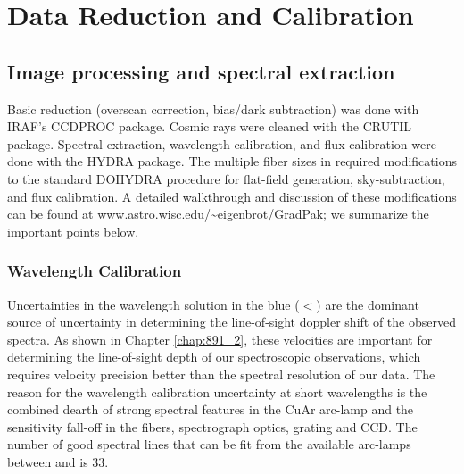 \section{Data Reduction and Calibration}
\label{891_1:sec:data_reduction}

\subsection{Image processing and spectral extraction}

Basic reduction (overscan correction, bias/dark subtraction) was done
with IRAF's CCDPROC package. Cosmic rays were cleaned with the CRUTIL
package. Spectral extraction, wavelength calibration, and flux
calibration were done with the HYDRA package. The multiple fiber sizes
in \GP required modifications to the standard DOHYDRA procedure for
flat-field generation, sky-subtraction, and flux calibration. A
detailed walkthrough and discussion of these modifications can be
found at \url{www.astro.wisc.edu/~eigenbrot/GradPak}; we summarize the
important points below.

\subsubsection{Wavelength Calibration}
\label{891_1:sec:wavecal}

Uncertainties in the wavelength solution in the blue
($<$) are the dominant source of uncertainty in
determining the line-of-sight doppler shift of the observed
spectra. As shown in Chapter \ref{chap:891_2}, these velocities are
important for determining the line-of-sight depth of our spectroscopic
observations, which requires velocity precision better than the
spectral resolution of our data.
The reason for the wavelength calibration uncertainty
at short wavelengths is the combined dearth of strong spectral
features in the CuAr arc-lamp and the sensitivity fall-off in the
fibers, spectrograph optics, grating and CCD. The number of good
spectral lines that can be fit from the available arc-lamps between
 and  is 33.

